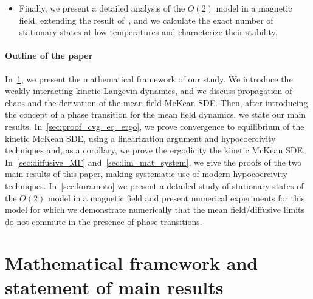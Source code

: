 \documentclass[onefignum,onetabnum]{siamart251216} %
\theoremstyle{plain}
\numberwithin{equation}{section}
\numberwithin{theorem}{section}
\begin{document}
\begin{itemize}

    \item Finally, we present a detailed analysis of the $O(2)$ model in a magnetic field, extending the result of~\cite[Lemma 1.26]{delgadino2021diffusive}, and we calculate the exact number of stationary states at low temperatures and characterize their stability.
\end{itemize}



\paragraph{Outline of the paper}
In~\cref{sec:Mathematical_framework}, we present the mathematical framework of our study.
We introduce the weakly interacting kinetic Langevin dynamics, and we discuss propagation of chaos and the derivation of the mean-field McKean SDE. Then, after introducing the concept of a phase transition for the mean field dynamics, we state our main results. In~\cref{sec:proof_cvg_eq_ergo}, we prove convergence to equilibrium of the kinetic McKean SDE, using a linearization argument and hypocoercivity techniques and, as a corollary, we prove the ergodicity the kinetic McKean SDE.
In~\cref{sec:diffusive_MF} and~\cref{sec:lim_mat_system},
we give the proofs of the two main results of this paper, making systematic use of modern hypocoercivity techniques.
In~\cref{sec:kuramoto} we present a detailed study of stationary states of the $O(2)$ model in a magnetic field and present numerical experiments for this model for which we demonstrate numerically that the mean field/diffusive limits do not commute in the presence of phase transitions.
\section{Mathematical framework and statement of main results}
\label{sec:Mathematical_framework}
\end{document}
